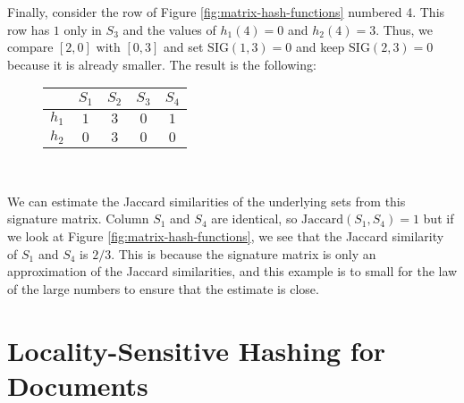 Finally, consider the row of Figure \ref{fig:matrix-hash-functions} numbered 4. This row has $1$ only in $S_3$ and the values of $h_1(4) = 0$ and $h_2(4) = 3$. Thus, we compare $[2, 0]$ with $[0, 3]$ and set $\text{SIG}(1, 3) = 0$ and keep $\text{SIG}(2, 3) = 0$ because it is already smaller. The result is the following:

\begin{figure}[H]
\centering
\begin{tabular}{|c||c|c|c|c|}
  \hline
   & $S_1$ & $S_2$ & $S_3$ & $S_4$\\
  \hline
  $h_1$ & $1$ & $3$ & $0$ & $1$ \\ 
  $h_2$ & $0$ & $3$ & $0$ & $0$ \\
  \hline
\end{tabular}
\captionsetup{justification=centering}\\
\label{fig:sig-matrix-3}
\end{figure}

We can estimate the Jaccard similarities of the underlying sets from this signature matrix. Column $S_1$ and $S_4$ are identical, so $\text{Jaccard}(S_1, S_4) = 1$ but if we look at Figure \ref{fig:matrix-hash-functions}, we see that the Jaccard similarity of $S_1$ and $S_4$ is $2/3$. This is because the signature matrix is only an approximation of the Jaccard similarities, and this example is to small for the law of the large numbers to ensure that the estimate is close.

\section{Locality-Sensitive Hashing for Documents}



